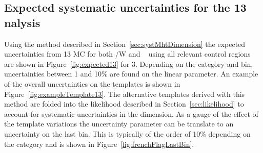 \subsection{Expected systematic uncertainties for the 13 \texorpdfstring{\TeV} analysis}
\label{sec:syst13TeV}
Using the method described in Section~\ref{sec:systMhtDimension} the expected uncertainties
from 13 \TeV MC for both \ttbar/W  and \zInv~ using all relevant control regions are
shown in Figure~\ref{fig:expected13} for 3\ifb. 
Depending on the category and \scalht bin, uncertainties between 1 and 10\% are found
on the linear parameter.
An example of the overall uncertainties on the \mht templates is shown
in Figure~\ref{fig:exampleTemplate13}.
The alternative templates derived with this method are folded into the 
likelihood described in Section~\ref{sec:likelihood} to account for
systematic uncertainties in the \mht dimension.
As a gauge of the effect of the template variations the uncertainty parameter 
can be translate to an uncertainty on the last bin. This is typically
of the order of 10\% depending on the category and is shown
in Figure~\ref{fig:frenchFlagLastBin}.


